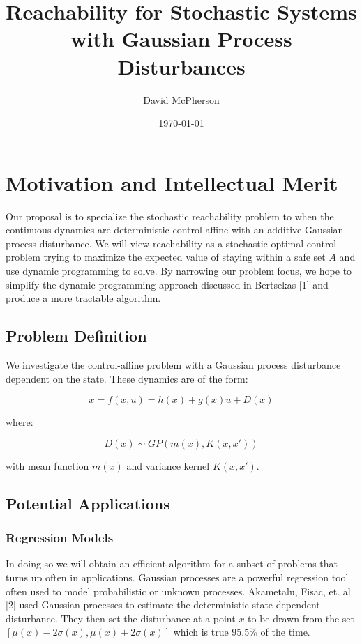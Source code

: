 \documentclass[a4paper]{article}
\title{Reachability for Stochastic Systems with Gaussian Process Disturbances}
\author{David McPherson}
\date{\today}
\begin{document}
\maketitle

\section{Motivation and Intellectual Merit}
Our proposal is to specialize the stochastic reachability problem to when the continuous dynamics are deterministic control affine with an additive Gaussian process disturbance.
We will view reachability as a stochastic optimal control problem trying to maximize the expected value of staying within a safe set $A$ and use dynamic programming to solve.
By narrowing our problem focus, we hope to simplify the dynamic programming approach discussed in Bertsekas [1] and produce a more tractable algorithm.

\subsection{Problem Definition}
We investigate the control-affine problem with a Gaussian process disturbance dependent on the state. These dynamics are of the form:

\begin{equation}
\dot{x} = f(x,u) = h(x) + g(x) u + D(x)
\end{equation}

where:

\begin{equation}
D(x) \sim GP(m(x),K(x,x'))
\end{equation}

with mean function $m(x)$ and variance kernel $K(x,x')$.

\subsection{Potential Applications}
\subsubsection{Regression Models}
In doing so we will obtain an efficient algorithm for a subset of problems that turns up often in applications.
Gaussian processes are a powerful regression tool often used to model probabilistic or unknown processes.
Akametalu, Fisac, et. al [2] used Gaussian processes to estimate the deterministic state-dependent disturbance.
They then set the disturbance at a point $x$ to be drawn from the set $[\mu(x)-2\sigma(x) , \mu(x)+2\sigma(x)]$ which is true 95.5\% of the time.
\end{document}
